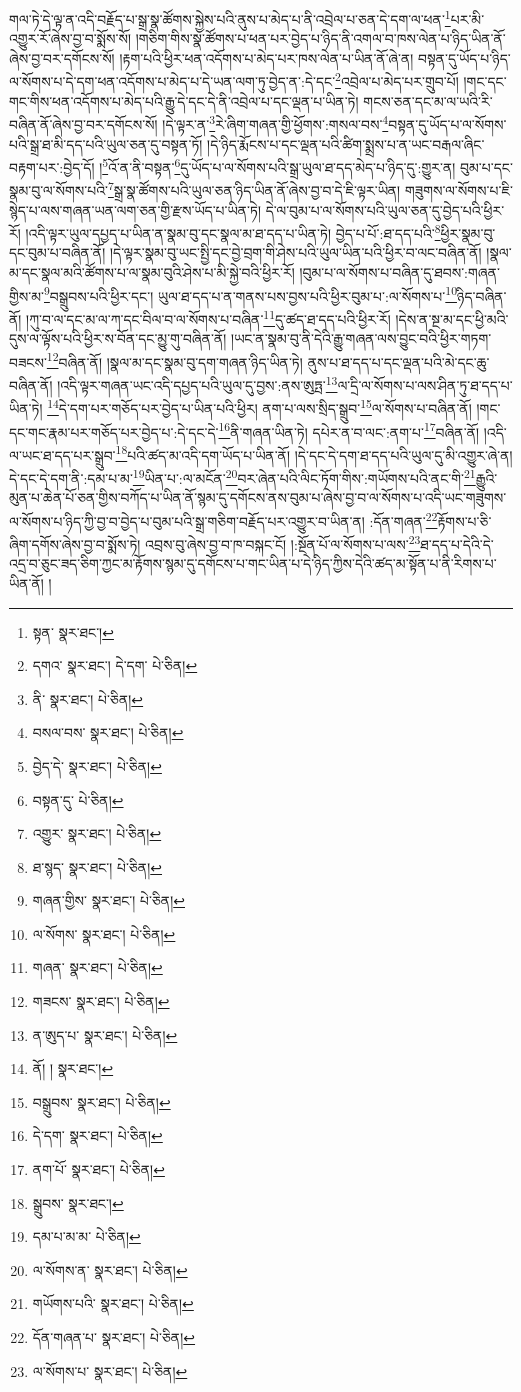 གལ་ཏེ་དེ་ལྟ་ན་འདི་བརྗོད་པ་སྒྲ་སྣ་ཚོགས་སྐྱེས་པའི་ནུས་པ་མེད་པ་ནི་འབྲེལ་པ་ཅན་དེ་དག་ལ་ཕན་\footnote{སྟན་  སྣར་ཐང་། }པར་མི་འགྱུར་རོ་ཞེས་བྱ་བ་སྨོས་སོ། །གཅིག་གིས་སྣ་ཚོགས་པ་ཕན་པར་བྱེད་པ་ཉིད་ནི་འགལ་བ་ཁས་ལེན་པ་ཉིད་ཡིན་ནོ་ཞེས་བྱ་བར་དགོངས་སོ། །རྟག་པའི་ཕྱིར་ཕན་འདོགས་པ་མེད་པར་ཁས་ལེན་པ་ཡིན་ནོ་ཞེ་ན། བསྟན་དུ་ཡོད་པ་ཉིད་ལ་སོགས་པ་དེ་དག་ཕན་འདོགས་པ་མེད་པ་དེ་ཡན་ལག་ཏུ་བྱེད་ན་:དེ་དང་\footnote{དགའ་  སྣར་ཐང་། དེ་དག་  པེ་ཅིན། }འབྲེལ་པ་མེད་པར་གྲུབ་པོ། །གང་དང་གང་གིས་ཕན་འདོགས་པ་མེད་པའི་རྒྱུ་དེ་དང་དེ་ནི་འབྲེལ་པ་དང་ལྡན་པ་ཡིན་ཏེ། གངས་ཅན་དང་མ་ལ་ཡའི་རི་བཞིན་ནོ་ཞེས་བྱ་བར་དགོངས་སོ། །དེ་ལྟར་ན་\footnote{ནི་  སྣར་ཐང་།  པེ་ཅིན། }རེ་ཞིག་གཞན་གྱི་ཕྱོགས་:གསལ་བས་\footnote{བསལ་བས་  སྣར་ཐང་།  པེ་ཅིན། }བསྟན་དུ་ཡོད་པ་ལ་སོགས་པའི་སྒྲ་ཐ་མི་དད་པའི་ཡུལ་ཅན་དུ་བསྟན་ཏོ། །དེ་ཉིད་རྨོངས་པ་དང་ལྡན་པའི་ཚིག་སྨྲས་པ་ན་ཡང་བརྒལ་ཞིང་བརྟག་པར་:བྱེད་དོ། །\footnote{བྱེད་དེ་  སྣར་ཐང་།  པེ་ཅིན། }འོ་ན་ནི་བསྟན་\footnote{བསྟན་དུ་  པེ་ཅིན། }དུ་ཡོད་པ་ལ་སོགས་པའི་སྒྲ་ཡུལ་ཐ་དད་མེད་པ་ཉིད་དུ་:གྱུར་ན། བུམ་པ་དང་སྣམ་བུ་ལ་སོགས་པའི་\footnote{འགྱུར་  སྣར་ཐང་།  པེ་ཅིན། }སྒྲ་སྣ་ཚོགས་པའི་ཡུལ་ཅན་ཉིད་ཡིན་ནོ་ཞེས་བྱ་བ་དེ་ཇི་ལྟར་ཡིན། གཟུགས་ལ་སོགས་པ་ཇི་སྙེད་པ་ལས་གཞན་ཡན་ལག་ཅན་གྱི་རྫས་ཡོད་པ་ཡིན་ཏེ། དེ་ལ་བུམ་པ་ལ་སོགས་པའི་ཡུལ་ཅན་དུ་བྱེད་པའི་ཕྱིར་རོ། །འདི་ལྟར་ཡུལ་དཔྱད་པ་ཡིན་ན་སྣམ་བུ་དང་སྣལ་མ་ཐ་དད་པ་ཡིན་ཏེ། བྱེད་པ་པོ་:ཐ་དད་པའི་\footnote{ཐ་སྙད་  སྣར་ཐང་།  པེ་ཅིན། }ཕྱིར་སྣམ་བུ་དང་བུམ་པ་བཞིན་ནོ། །དེ་ལྟར་སྣམ་བུ་ཡང་སྤྱི་དང་བྱེ་བྲག་གི་ཤེས་པའི་ཡུལ་ཡིན་པའི་ཕྱིར་བ་ལང་བཞིན་ནོ། །སྣལ་མ་དང་སྣལ་མའི་ཚོགས་པ་ལ་སྣམ་བུའི་ཤེས་པ་མི་སྐྱེ་བའི་ཕྱིར་རོ། །བུམ་པ་ལ་སོགས་པ་བཞིན་དུ་ཐབས་:གཞན་གྱིས་མ་\footnote{གཞན་གྱིས་  སྣར་ཐང་།  པེ་ཅིན། }བསྒྲུབས་པའི་ཕྱིར་དང་། ཡུལ་ཐ་དད་པ་ན་གནས་པས་བྱས་པའི་ཕྱིར་བུམ་པ་:ལ་སོགས་པ་\footnote{ལ་སོགས་  སྣར་ཐང་།  པེ་ཅིན། }ཉིད་བཞིན་ནོ། །ཀུ་བ་ལ་དང་མ་ལ་ཀ་དང་བིལ་བ་ལ་སོགས་པ་བཞིན་\footnote{གཞན་  སྣར་ཐང་།  པེ་ཅིན། }དུ་ཚད་ཐ་དད་པའི་ཕྱིར་རོ། །དེས་ན་སྔ་མ་དང་ཕྱི་མའི་དུས་ལ་ལྟོས་པའི་ཕྱིར་ས་བོན་དང་མྱུ་གུ་བཞིན་ནོ། །ཡང་ན་སྣམ་བུ་ནི་དེའི་རྒྱུ་གཞན་ལས་བྱུང་བའི་ཕྱིར་གཏག་བཟངས་\footnote{གཟངས་  སྣར་ཐང་།  པེ་ཅིན། }བཞིན་ནོ། །སྣལ་མ་དང་སྣམ་བུ་དག་གཞན་ཉིད་ཡིན་ཏེ། ནུས་པ་ཐ་དད་པ་དང་ལྡན་པའི་མེ་དང་ཆུ་བཞིན་ནོ། །འདི་ལྟར་གཞན་ཡང་འདི་དཔྱད་པའི་ཡུལ་དུ་བྱས་:ནས་ཨུཏྤ་\footnote{ན་ཨུད་པ་  སྣར་ཐང་།  པེ་ཅིན། }ལ་དྲི་ལ་སོགས་པ་ལས་ཤིན་ཏུ་ཐ་དད་པ་ཡིན་ཏེ། \footnote{ནོ། །   སྣར་ཐང་། }དེ་དག་པར་གཅོད་པར་བྱེད་པ་ཡིན་པའི་ཕྱིར། ནག་པ་ལས་སྲིད་སྒྲུབ་\footnote{བསྒྲུབས་  སྣར་ཐང་།  པེ་ཅིན། }ལ་སོགས་པ་བཞིན་ནོ། །གང་དང་གང་རྣམ་པར་གཅོད་པར་བྱེད་པ་:དེ་དང་དེ་\footnote{དེ་དག་  སྣར་ཐང་།  པེ་ཅིན། }ནི་གཞན་ཡིན་ཏེ། དཔེར་ན་བ་ལང་:ནག་པ་\footnote{ནག་པོ་  སྣར་ཐང་།  པེ་ཅིན། }བཞིན་ནོ། །འདི་ལ་ཡང་ཐ་དད་པར་སྒྲུབ་\footnote{སྒྲུབས་  སྣར་ཐང་། }པའི་ཚད་མ་འདི་དག་ཡོད་པ་ཡིན་ནོ། །དེ་དང་དེ་དག་ཐ་དད་པའི་ཡུལ་དུ་མི་འགྱུར་ཞེ་ན། དེ་དང་དེ་དག་ནི་:དམ་པ་མ་\footnote{དམ་པ་མ་མ་  པེ་ཅིན། }ཡིན་པ་:ལ་མངོན་\footnote{ལ་སོགས་ན་  སྣར་ཐང་།  པེ་ཅིན། }བར་ཞེན་པའི་ལིང་ཏོག་གིས་:གཡོགས་པའི་ནང་གི་\footnote{གཡོགས་པའི་  སྣར་ཐང་།  པེ་ཅིན། }རྒྱུའི་མུན་པ་ཆེན་པོ་ཅན་གྱིས་བཀོད་པ་ཡིན་ནོ་སྙམ་དུ་དགོངས་ནས་བུམ་པ་ཞེས་བྱ་བ་ལ་སོགས་པ་འདི་ཡང་གཟུགས་ལ་སོགས་པ་ཉིད་ཀྱི་བྱ་བ་བྱེད་པ་བུམ་པའི་སྒྲ་གཅིག་བརྗོད་པར་འགྱུར་བ་ཡིན་ན། :དོན་གཞན་\footnote{དོན་གཞན་པ་  སྣར་ཐང་།  པེ་ཅིན། }རྟོགས་པ་ཅི་ཞིག་དགོས་ཞེས་བྱ་བ་སྨོས་ཏེ། འབྲས་བུ་ཞེས་བྱ་བ་ཁ་བསྐང་ངོ། །:སྔོན་པོ་ལ་སོགས་པ་ལས་\footnote{ལ་སོགས་པ་  སྣར་ཐང་།  པེ་ཅིན། }ཐ་དད་པ་དེའི་དེ་འདྲ་བ་ཅུང་ཟད་ཅིག་ཀྱང་མ་རྟོགས་སྙམ་དུ་དགོངས་པ་གང་ཡིན་པ་དེ་ཉིད་ཀྱིས་དེའི་ཚད་མ་སྟོན་པ་ནི་རིགས་པ་ཡིན་ནོ། །
